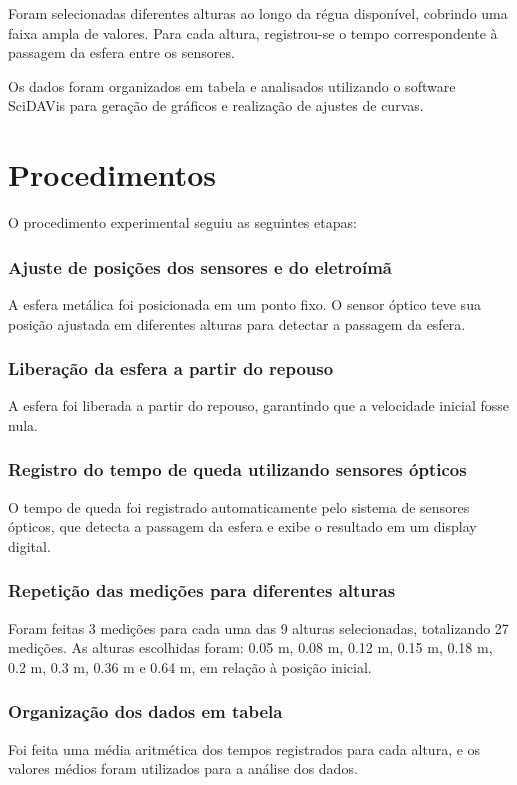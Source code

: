\documentclass[12pt,a4paper]{article}
\begin{document}
Foram selecionadas diferentes alturas ao longo da régua disponível, cobrindo uma faixa ampla de valores. Para cada altura, registrou-se o tempo correspondente à passagem da esfera entre os sensores.

Os dados foram organizados em tabela e analisados utilizando o software SciDAVis para geração de gráficos e realização de ajustes de curvas.

\section{Procedimentos}

O procedimento experimental seguiu as seguintes etapas:

\subsubsection{Ajuste de posições dos sensores e do eletroímã}
A esfera metálica foi posicionada em um ponto fixo. O sensor óptico teve sua posição ajustada em diferentes alturas para detectar a passagem da esfera.

\subsubsection{Liberação da esfera a partir do repouso}
A esfera foi liberada a partir do repouso, garantindo que a velocidade inicial fosse nula.

\subsubsection{Registro do tempo de queda utilizando sensores ópticos}
O tempo de queda foi registrado automaticamente pelo sistema de sensores ópticos, que detecta a passagem da esfera e exibe o resultado em um display digital.

\subsubsection{Repetição das medições para diferentes alturas}
Foram feitas 3 medições para cada uma das 9 alturas selecionadas, totalizando 27 medições. As alturas escolhidas foram: 0.05 m, 0.08 m, 0.12 m, 0.15 m, 0.18 m, 0.2 m, 0.3 m, 0.36 m e 0.64 m, em relação à posição inicial.

\subsubsection{Organização dos dados em tabela}
Foi feita uma média aritmética dos tempos registrados para cada altura, e os valores médios foram utilizados para a análise dos dados.
\end{document}
